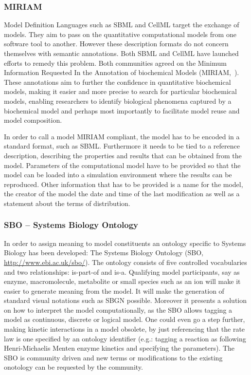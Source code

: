\documentclass[12pt]{article}
\begin{document}
\subsubsection{MIRIAM}

Model Definition Languages such as SBML and CellML target the
exchange of models. They aim to pass on the quantitative
computational models from one software tool to another. However
these description formats do not concern themselves with semantic
annotations. Both SBML and CellML have launched efforts to remedy
this problem. Both communities agreed on the Minimum Information
Requested In the Annotation of biochemical Models
(MIRIAM,~\citet{miriam}). These annotations aim to further the
confidence in quantitative biochemical models, making it easier and
more precise to search for particular biochemical models, enabling
researchers to identify biological phenomena captured by a
biochemical model and perhaps most importantly to facilitate model
reuse and model composition.

In order to call a model MIRIAM compliant, the model has to be encoded in a standard format, such as SBML. Furthermore it needs to be tied to a reference description, describing the properties and results that can be obtained from the model. Parameters of the computational model have to be provided so that the model can be loaded into a simulation environment where the results can be reproduced. Other information that has to be provided is a name for the model, the creator of the model the date and time of the last modification as well as a statement about the terms of distribution.


\subsubsection{SBO -- Systems Biology Ontology}\label{sec:SBO}

In order to assign meaning to model constituents an ontology
specific to Systems Biology has been developed: The Systems Biology
Ontology (SBO, \url{http://www.ebi.ac.uk/sbo/}). The ontology consists of five controlled vocabularies and two relationships: is-part-of and is-a.
Qualifying model participants, say as enzyme, macromolecule,
metabolite or small species such as an ion will make it easier to
generate meaning from the model. It will make the generation of
standard visual notations such as SBGN possible. Moreover it
presents a solution on how to interpret the model computationally,
as the SBO allows tagging a model as continuous, discrete or logical
model. One could even go a step further, making kinetic interactions
in a model obsolete, by just referencing that the rate law is one
specified by an ontology identifier (e.g.: tagging a reaction as
following Henri-Michaelis Menten enzyme kinetics and specifying the
parameters). The SBO is community driven and new terms or
modifications to the existing onotology can be requested by the
community.
\end{document}
